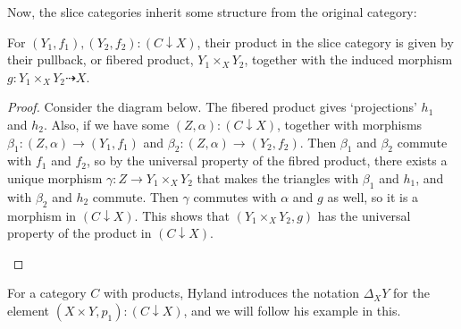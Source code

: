 Now, the slice categories inherit some structure from the original category:
\begin{lemma}
  For $ (Y_1, f_1), (Y_2, f_2) : (C \downarrow X) $, their product in the slice category is given by their pullback, or fibered product, $ Y_1 \times_X Y_2 $, together with the induced morphism $ g: Y_1 \times_X Y_2 \dasharrow X $.
\end{lemma}
\begin{proof}
  Consider the diagram below. The fibered product gives `projections' $ h_1 $ and $ h_2 $. Also, if we have some $ (Z, \alpha) : (C \downarrow X) $, together with morphisms $ \beta_1 : (Z, \alpha) \to (Y_1, f_1) $ and $ \beta_2 : (Z, \alpha) \to (Y_2, f_2) $. Then $ \beta_1 $ and $ \beta_2 $ commute with $ f_1 $ and $ f_2 $, so by the universal property of the fibred product, there exists a unique morphism $ \gamma : Z \to Y_1 \times_X Y_2 $ that makes the triangles with $ \beta_1 $ and $ h_1 $, and with $ \beta_2 $ and $ h_2 $ commute. Then $ \gamma $ commutes with $ \alpha $ and $ g $ as well, so it is a morphism in $ (C \downarrow X) $. This shows that $ (Y_1 \times_X Y_2, g) $ has the universal property of the product in $ (C \downarrow X) $.
  \begin{center}
  \end{center}
\end{proof}

For a category $ C $ with products, Hyland introduces the notation $ \Delta_X Y $ for the element $ (X \times Y, p_1) : (C \downarrow X) $, and we will follow his example in this.

